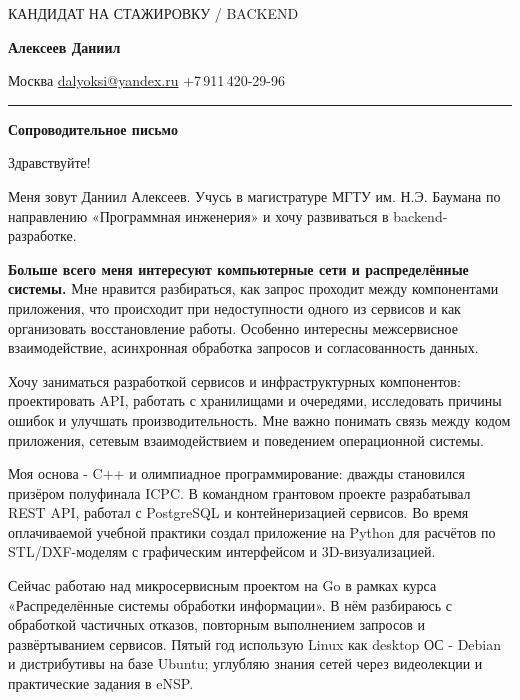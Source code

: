 \documentclass[11pt,a4paper]{article}
\begin{document}
\color{ink}

{\small\color{accent}КАНДИДАТ НА СТАЖИРОВКУ \enspace / \enspace BACKEND}\par
\vspace{0.1em}
{\fontsize{23}{27}\selectfont\bfseries Алексеев Даниил}\par
\vspace{-0.1em}
{\small\color{muted}
  Москва \enspace\textbullet\enspace
  \href{mailto:dalyoksi@yandex.ru}{dalyoksi@yandex.ru}
  \enspace\textbullet\enspace +7\,911\,420-29-96
}\par
\vspace{0.3em}
{\color{accent}\rule{\textwidth}{1.2pt}}\par
\vspace{0.5em}

{\fontsize{16}{20}\selectfont\bfseries Сопроводительное письмо}\par
\vspace{0.25em}

Здравствуйте!

Меня зовут Даниил Алексеев. Учусь в магистратуре МГТУ им. Н.Э. Баумана по направлению «Программная инженерия» и хочу развиваться в backend-разработке.

\textbf{Больше всего меня интересуют компьютерные сети и распределённые системы.} Мне нравится разбираться, как запрос проходит между компонентами приложения, что происходит при недоступности одного из сервисов и как организовать восстановление работы. Особенно интересны межсервисное взаимодействие, асинхронная обработка запросов и согласованность данных.

Хочу заниматься разработкой сервисов и инфраструктурных компонентов: проектировать API, работать с хранилищами и очередями, исследовать причины ошибок и улучшать производительность. Мне важно понимать связь между кодом приложения, сетевым взаимодействием и поведением операционной системы.

Моя основа - C++ и олимпиадное программирование: дважды становился призёром полуфинала ICPC. В командном грантовом проекте разрабатывал REST API, работал с PostgreSQL и контейнеризацией сервисов. Во время оплачиваемой учебной практики создал приложение на Python для расчётов по STL/DXF-моделям с графическим интерфейсом и 3D-визуализацией.

Сейчас работаю над микросервисным проектом на Go в рамках курса «Распределённые системы обработки информации». В нём разбираюсь с обработкой частичных отказов, повторным выполнением запросов и развёртыванием сервисов. Пятый год использую Linux как desktop ОС - Debian и дистрибутивы на базе Ubuntu; углубляю знания сетей через видеолекции и практические задания в eNSP.
\end{document}
